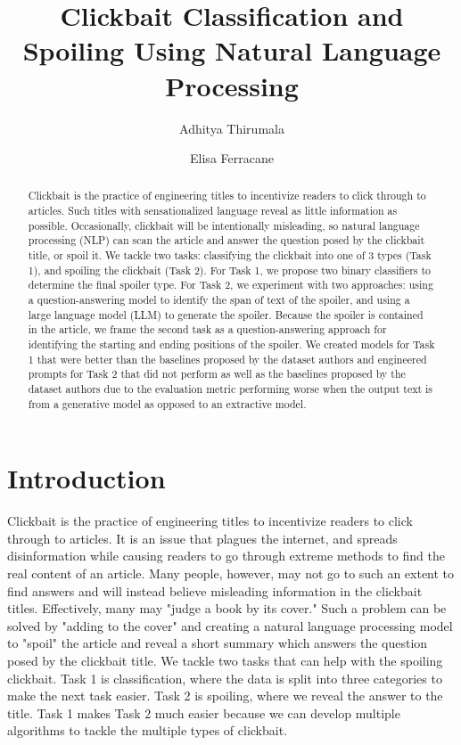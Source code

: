 \documentclass[12pt]{article}
\title{Clickbait Classification and Spoiling Using Natural Language Processing}
\author{Adhitya Thirumala \and Elisa Ferracane}
\begin{document}
\maketitle
\begin{abstract}
Clickbait is the practice of engineering titles to incentivize readers to click through to articles. Such titles with sensationalized language reveal as little information as possible. Occasionally, clickbait will be intentionally misleading, so natural language processing (NLP) can scan the article and answer the question posed by the clickbait title, or spoil it. We tackle two tasks: classifying the clickbait into one of 3 types (Task 1), and spoiling the clickbait (Task 2). For Task 1, we propose two binary classifiers to determine the final spoiler type. For Task 2, we experiment with two  approaches: using a question-answering model to identify the span of text of the spoiler, and using a large language model (LLM) to generate the spoiler. Because the spoiler is contained in the article, we frame the second task as a question-answering approach for identifying the starting and ending positions of the spoiler. We created models for Task 1 that were better than the baselines proposed by the dataset authors and engineered prompts for Task 2 that did not perform as well as the baselines proposed by the dataset authors due to the evaluation metric performing worse when the output text is from a generative model as opposed to an extractive model.
\end{abstract}


\section{Introduction}

Clickbait is the practice of engineering titles to incentivize readers to click through to articles. It is an issue that plagues the internet, and spreads disinformation while causing readers to go through extreme methods to find the real content of an article. Many people, however, may not go to such an extent to find answers and will instead believe misleading information in the clickbait titles. Effectively, many may "judge a book by its cover." Such a problem can be solved by "adding to the cover" and creating a natural language processing model to "spoil" the article and reveal a short summary which answers the question posed by the clickbait title. We tackle two tasks that can help with the spoiling clickbait. Task 1 is classification, where the data is split into three categories to make the next task easier. Task 2 is spoiling, where we reveal the answer to the title. Task 1 makes Task 2 much easier because we can develop multiple algorithms to tackle the multiple types of clickbait. 
\end{document}
